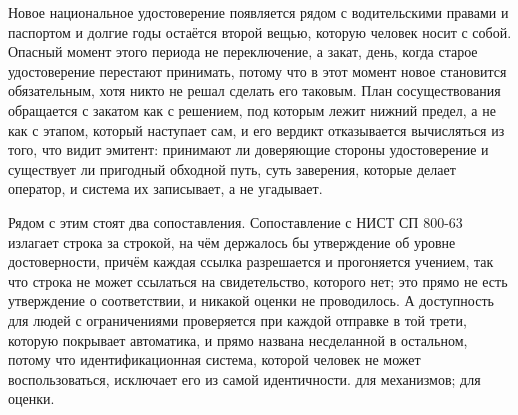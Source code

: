 Новое национальное удостоверение появляется рядом с водительскими правами и паспортом и долгие
годы остаётся второй вещью, которую человек носит с собой. Опасный момент этого периода не
переключение, а закат, день, когда старое удостоверение перестают принимать, потому что в этот
момент новое становится обязательным, хотя никто не решал сделать его таковым. План
сосуществования обращается с закатом как с решением, под которым лежит нижний
предел, а не как с этапом, который наступает сам, и его вердикт отказывается вычисляться из того,
что видит эмитент: принимают ли доверяющие стороны удостоверение и существует ли пригодный
обходной путь, суть заверения, которые делает оператор, и система их записывает, а не
угадывает. \sImpl

Рядом с этим стоят два сопоставления. Сопоставление с НИСТ СП 800-63 излагает строка за строкой,
на чём держалось бы утверждение об уровне достоверности, причём каждая ссылка разрешается и
прогоняется учением, так что строка не может ссылаться на свидетельство, которого нет; это прямо
не есть утверждение о соответствии, и никакой оценки не проводилось. А доступность для людей с
ограничениями проверяется при каждой отправке в той трети, которую покрывает автоматика, и прямо
названа несделанной в остальном, потому что идентификационная система, которой человек не может
воспользоваться, исключает его из самой идентичности. \sImplMark{} для механизмов; \sExt{} для
оценки.

